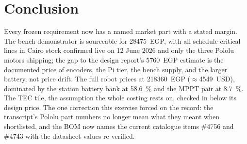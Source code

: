 \documentclass[11pt,a4paper]{article}
\begin{document}
\section{Conclusion}

Every frozen requirement now has a named market part with a stated margin.
The bench demonstrator is sourceable for \num{28475}~EGP, with all
schedule-critical lines in Cairo stock confirmed live on 12 June 2026 and
only the three Pololu motors shipping; the gap to the design report's
\num{5760}~EGP estimate is the documented price of encoders, the Pi tier,
the bench supply, and the larger battery, not price drift. The full robot
prices at \num{218360}~EGP ($\approx$\num{4549}~USD), dominated by the
station battery bank at \SI{58.6}{\percent} and the MPPT pair at
\SI{8.7}{\percent}. The TEC tile, the assumption the whole costing rests on,
checked in below its design price. The one correction this exercise forced
on the record: the transcript's Pololu part numbers no longer mean what they
meant when shortlisted, and the BOM now names the current catalogue items
\#4756 and \#4743 with the datasheet values re-verified.



\end{document}
